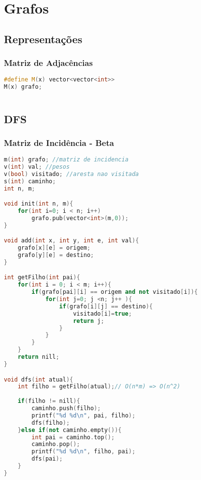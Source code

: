 \chapter{Grafos}

\section{Representações}
\subsection*{Matriz de Adjacências}

\begin{lstlisting}[language=C++, title={Matriz de Adjacências}]
#define M(x) vector<vector<int>>
M(x) grafo;
\end{lstlisting}

\begin{lstlisting}[language=C++, title={Lista de Adjacências}]

\end{lstlisting}

\section{DFS}
\subsection*{Matriz de Incidência - Beta}
\begin{lstlisting}[language=C++]
m(int) grafo; //matriz de incidencia
v(int) val; //pesos
v(bool) visitado; //aresta nao visitada
s(int) caminho;
int n, m;

void init(int n, m){
	for(int i=0; i < n; i++) 
		grafo.pub(vector<int>(m,0));
}

void add(int x, int y, int e, int val){
	grafo[x][e] = origem;
	grafo[y][e] = destino;
}

int getFilho(int pai){
	for(int i = 0; i < m; i++){
		if(grafo[pai][i] == origem and not visitado[i]){
			for(int j=0; j <n; j++ ){
				if(grafo[i][j] == destino){
					visitado[i]=true;
					return j;
				}
			}
		}
	}
	return nill;
}

void dfs(int atual){
	int filho = getFilho(atual);// O(n*m) => O(n^2)
	
	if(filho != nill){
		caminho.push(filho);
		printf("%d %d\n", pai, filho);
		dfs(filho);
	}else if(not caminho.empty()){
		int pai = caminho.top();
		caminho.pop();
		printf("%d %d\n", filho, pai);
		dfs(pai);
	}
}
\end{lstlisting}
